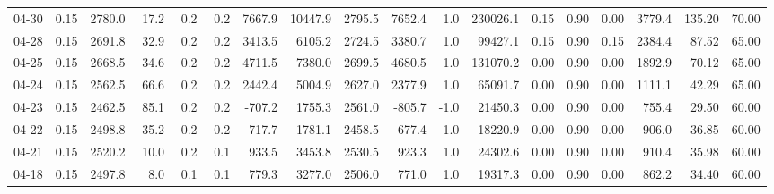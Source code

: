 \begin{threeparttable}
{\begin{tabular}{lrrrrrrrrrrrrrrrrr}
  04-30 &     0.15 & 2780.0 &              17.2 &               0.2 &                0.2 &             7667.9 & 10447.9 & 2795.5 &     7652.4 &                      1.0 &            230026.1 &       0.15 &      0.90 &           0.00 &           3779.4 &          135.20 &                  70.00 \\
  04-28 &     0.15 & 2691.8 &              32.9 &               0.2 &                0.2 &             3413.5 &  6105.2 & 2724.5 &     3380.7 &                      1.0 &             99427.1 &       0.15 &      0.90 &           0.15 &           2384.4 &           87.52 &                  65.00 \\
  04-25 &     0.15 & 2668.5 &              34.6 &               0.2 &                0.2 &             4711.5 &  7380.0 & 2699.5 &     4680.5 &                      1.0 &            131070.2 &       0.00 &      0.90 &           0.00 &           1892.9 &           70.12 &                  65.00 \\
  04-24 &     0.15 & 2562.5 &              66.6 &               0.2 &                0.2 &             2442.4 &  5004.9 & 2627.0 &     2377.9 &                      1.0 &             65091.7 &       0.00 &      0.90 &           0.00 &           1111.1 &           42.29 &                  65.00 \\
  04-23 &     0.15 & 2462.5 &              85.1 &               0.2 &                0.2 &             -707.2 &  1755.3 & 2561.0 &     -805.7 &                     -1.0 &             21450.3 &       0.00 &      0.90 &           0.00 &            755.4 &           29.50 &                  60.00 \\
  04-22 &     0.15 & 2498.8 &             -35.2 &              -0.2 &               -0.2 &             -717.7 &  1781.1 & 2458.5 &     -677.4 &                     -1.0 &             18220.9 &       0.00 &      0.90 &           0.00 &            906.0 &           36.85 &                  60.00 \\
  04-21 &     0.15 & 2520.2 &              10.0 &               0.2 &                0.1 &              933.5 &  3453.8 & 2530.5 &      923.3 &                      1.0 &             24302.6 &       0.00 &      0.90 &           0.00 &            910.4 &           35.98 &                  60.00 \\
  04-18 &     0.15 & 2497.8 &               8.0 &               0.1 &                0.1 &              779.3 &  3277.0 & 2506.0 &      771.0 &                      1.0 &             19317.3 &       0.00 &      0.90 &           0.00 &            862.2 &           34.40 &                  60.00 \\

\end{tabular}}
\end{threeparttable}
